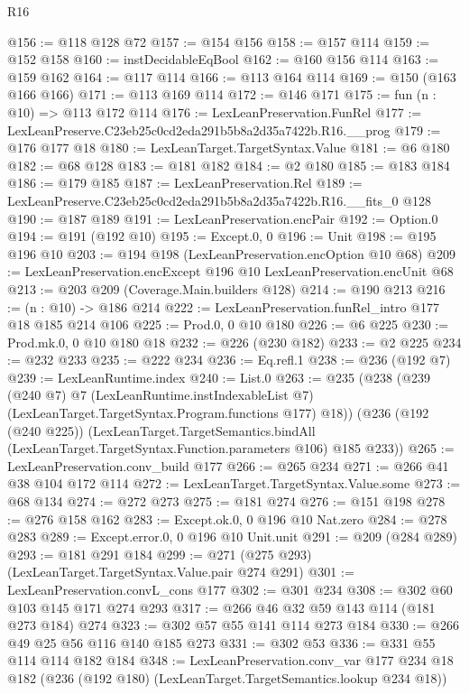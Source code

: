 \begin{lexlean}{R16}
\begin{coremodule}
@156 := @118 @128 @72
@157 := @154 @156
@158 := @157 @114
@159 := @152 @158
@160 := instDecidableEqBool
@162 := @160 @156 @114
@163 := @159 @162
@164 := @117 @114
@166 := @113 @164 @114
@169 := @150 (@163 @166 @166)
@171 := @113 @169 @114
@172 := @146 @171
@175 := fun (n : @10) => @113 @172 @114
@176 := LexLeanPreservation.FunRel
@177 := LexLeanPreserve.C23eb25c0cd2eda291b5b8a2d35a7422b.R16.__prog
@179 := @176 @177 @18
@180 := LexLeanTarget.TargetSyntax.Value
@181 := @6 @180
@182 := @68 @128
@183 := @181 @182
@184 := @2 @180
@185 := @183 @184
@186 := @179 @185
@187 := LexLeanPreservation.Rel
@189 := LexLeanPreserve.C23eb25c0cd2eda291b5b8a2d35a7422b.R16.__fits_0 @128
@190 := @187 @189
@191 := LexLeanPreservation.encPair
@192 := Option.{0}
@194 := @191 (@192 @10)
@195 := Except.{0, 0}
@196 := Unit
@198 := @195 @196 @10
@203 := @194 @198 (LexLeanPreservation.encOption @10 @68)
@209 := LexLeanPreservation.encExcept @196 @10 LexLeanPreservation.encUnit @68
@213 := @203 @209 (Coverage.Main.builders @128)
@214 := @190 @213
@216 := (n : @10) -> @186 @214
@222 := LexLeanPreservation.funRel_intro @177 @18 @185 @214 @106
@225 := Prod.{0, 0} @10 @180
@226 := @6 @225
@230 := Prod.mk.{0, 0} @10 @180 @18
@232 := @226 (@230 @182)
@233 := @2 @225
@234 := @232 @233
@235 := @222 @234
@236 := Eq.refl.{1}
@238 := @236 (@192 @7)
@239 := LexLeanRuntime.index
@240 := List.{0}
@263 := @235
    (@238
      (@239
        (@240 @7)
        @7
        (LexLeanRuntime.instIndexableList @7)
        (LexLeanTarget.TargetSyntax.Program.functions @177)
        @18))
    (@236
      (@192 (@240 @225))
      (LexLeanTarget.TargetSemantics.bindAll
        (LexLeanTarget.TargetSyntax.Function.parameters @106)
        @185
        @233))
@265 := LexLeanPreservation.conv_build @177
@266 := @265 @234
@271 := @266 @41 @38 @104 @172 @114
@272 := LexLeanTarget.TargetSyntax.Value.some
@273 := @68 @134
@274 := @272 @273
@275 := @181 @274
@276 := @151 @198
@278 := @276 @158 @162
@283 := Except.ok.{0, 0} @196 @10 Nat.zero
@284 := @278 @283
@289 := Except.error.{0, 0} @196 @10 Unit.unit
@291 := @209 (@284 @289)
@293 := @181 @291 @184
@299 := @271 (@275 @293) (LexLeanTarget.TargetSyntax.Value.pair @274 @291)
@301 := LexLeanPreservation.convL_cons @177
@302 := @301 @234
@308 := @302 @60 @103 @145 @171 @274 @293
@317 := @266 @46 @32 @59 @143 @114 (@181 @273 @184) @274
@323 := @302 @57 @55 @141 @114 @273 @184
@330 := @266 @49 @25 @56 @116 @140 @185 @273
@331 := @302 @53
@336 := @331 @55 @114 @114 @182 @184
@348 := LexLeanPreservation.conv_var
    @177
    @234
    @18
    @182
    (@236 (@192 @180) (LexLeanTarget.TargetSemantics.lookup @234 @18))

\end{coremodule}
\end{lexlean}
